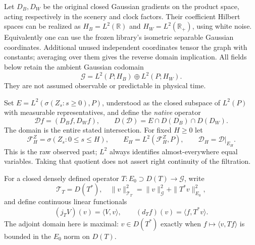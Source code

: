 \documentclass[11pt]{article}
\newcommand{\R}{\mathbb R}\newcommand{\E}{\mathbb E}
\newcommand{\D}{\mathcal D}\newcommand{\G}{\mathcal G}
\begin{document}
Let $D_B,D_W$ be the original closed Gaussian gradients on the product
space, acting respectively in the scenery and clock factors. Their
coefficient Hilbert spaces can be realized as $H_B=L^2(\R)$ and
$H_W=L^2(\R_+)$, using white noise. Equivalently one can use the frozen
library's isometric separable Gaussian coordinates. Additional unused
independent coordinates tensor the graph with constants; averaging over
them gives the reverse domain implication. All fields below retain the
ambient Gaussian codomain
\[
 \G=L^2(P;H_B)\oplus L^2(P;H_W).
\]
They are not assumed observable or predictable in physical time.

Set $E=L^2(\sigma(Z_s:s\geq0),P)$, understood as the closed subspace of
$L^2(P)$ with measurable representatives, and define the \emph{native}
operator
\begin{equation}\label{eq:domain}
 \D f=(D_Bf,D_Wf),\qquad
 D(\D)=E\cap D(D_B)\cap D(D_W).
\end{equation}
The domain is the entire stated intersection. For fixed $H\geq0$ let
\[
 \mathcal F_H^Z=\sigma(Z_s:0\leq s\leq H),\qquad
 E_H=L^2(\mathcal F_H^Z,P),\qquad \D_H=\D|_{E_H}.
\]
This is the raw observed past; $L^2$ always identifies almost-everywhere
equal variables. Taking that quotient does not assert right continuity
of the filtration.

For a closed densely defined operator $T:E_0\supset D(T)\to\G$, write
\[
 \mathcal T_T=D(T^*),\quad
 \|v\|_{\mathcal T_T}^2=\|v\|_{\G}^2+\|T^*v\|_{E_0}^2,
\]
and define continuous linear functionals
\begin{equation}\label{eq:dual}
 (j_TV)(v)=\langle V,v\rangle,\qquad
 (d_Tf)(v)=\langle f,T^*v\rangle.
\end{equation}
The adjoint domain here is maximal: $v\in D(T^*)$ exactly when
$f\mapsto\langle v,Tf\rangle$ is bounded in the $E_0$ norm on $D(T)$.
\end{document}
